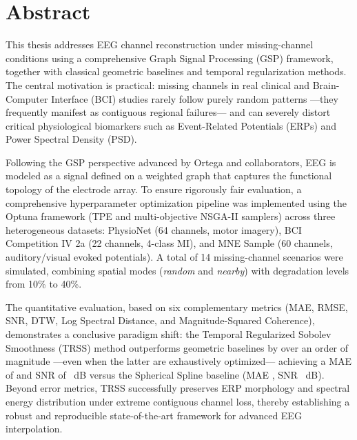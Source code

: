 \chapter*{Abstract}

This thesis addresses EEG channel reconstruction under missing-channel conditions using a comprehensive Graph Signal Processing (GSP) framework, together with classical geometric baselines and temporal regularization methods. The central motivation is practical: missing channels in real clinical and Brain-Computer Interface (BCI) studies rarely follow purely random patterns ---they frequently manifest as contiguous regional failures--- and can severely distort critical physiological biomarkers such as Event-Related Potentials (ERPs) and Power Spectral Density (PSD).

Following the GSP perspective advanced by Ortega and collaborators, EEG is modeled as a signal defined on a weighted graph that captures the functional topology of the electrode array. To ensure rigorously fair evaluation, a comprehensive hyperparameter optimization pipeline was implemented using the Optuna framework (TPE and multi-objective NSGA-II samplers) across three heterogeneous datasets: PhysioNet (64 channels, motor imagery), BCI Competition IV 2a (22 channels, 4-class MI), and MNE Sample (60 channels, auditory/visual evoked potentials). A total of 14 missing-channel scenarios were simulated, combining spatial modes (\textit{random} and \textit{nearby}) with degradation levels from 10\% to 40\%.

The quantitative evaluation, based on six complementary metrics (MAE, RMSE, SNR, DTW, Log Spectral Distance, and Magnitude-Squared Coherence), demonstrates a conclusive paradigm shift: the Temporal Regularized Sobolev Smoothness (TRSS) method outperforms geometric baselines by over an order of magnitude ---even when the latter are exhaustively optimized--- achieving a MAE of \ResTVMAE{} and SNR of \ResTVSNR~dB versus the Spherical Spline baseline (MAE \ResBaselineMAE{}, SNR \ResBaselineSNR~dB). Beyond error metrics, TRSS successfully preserves ERP morphology and spectral energy distribution under extreme contiguous channel loss, thereby establishing a robust and reproducible state-of-the-art framework for advanced EEG interpolation.
